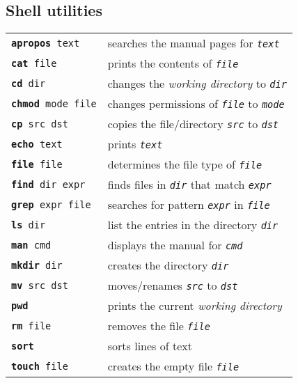 \documentclass[landscape, a4paper]{article}
\newcommand{\cv}[1]{\textit{\texttt{#1}}}
\newcommand{\shcmd}[2]{\texttt{\textbf{#1} #2}}
\begin{document}
\begin{multicols*}{3}
\subsection*{Shell utilities}
\begin{tabular}{ll}
\shcmd{apropos}{text}       & searches the manual pages for \cv{text}\\
\shcmd{cat}{file}           & prints the contents of \cv{file}\\
\shcmd{cd}{dir}             & changes the \textit{working directory} to \cv{dir}\\
\shcmd{chmod}{mode file}    & changes permissions of \cv{file} to \cv{mode}\\
\shcmd{cp}{src dst}         & copies the file/directory \cv{src} to \cv{dst}\\
\shcmd{echo}{text}          & prints \cv{text}\\
\shcmd{file}{file}          & determines the file type of \cv{file}\\
\shcmd{find}{dir expr}      & finds files in \cv{dir} that match \cv{expr}\\
\shcmd{grep}{expr file}     & searches for pattern \cv{expr} in \cv{file}\\
\shcmd{ls}{dir}             & list the entries in the directory \cv{dir}\\
\shcmd{man}{cmd}            & displays the manual for \cv{cmd}\\
\shcmd{mkdir}{dir}          & creates the directory \cv{dir}\\
\shcmd{mv}{src dst}         & moves/renames \cv{src} to \cv{dst}\\
\shcmd{pwd}{}               & prints the current \textit{working directory}\\
\shcmd{rm}{file}            & removes the file \cv{file}\\
\shcmd{sort}{}              & sorts lines of text\\
\shcmd{touch}{file}         & creates the empty file \cv{file}
\end{tabular}

\end{multicols*}
\end{document}
